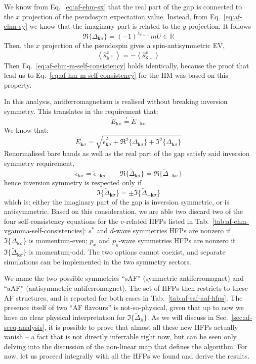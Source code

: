 \begin{tabproof}
	
	We know from Eq.~\eqref{eq:af-ehm-sx} that the real part of the gap is connected to the $x$ projection of the pseudospin expectation value. Instead, from Eq.~\eqref{eq:af-ehm-sy} we know that the imaginary part is related to the $y$ projection. It follows
	\[
		\Re \lbrace \tilde{\Delta}_{\mathbf{k}\sigma} \rbrace = (-1)^{\delta_{\sigma=\downarrow}} mU \in \mathbb{R}
	\]
	Then, the $x$ projection of the pseudospin gives a spin-antisymmetric EV,	
	\[
	\left\langle \hat s_{\mathbf{k}\uparrow}^x \right\rangle = -\left\langle \hat s_{\mathbf{k}\downarrow}^x \right\rangle
	\]
	Then Eq.~\eqref{eq:af-ehm-m-self-consistency} holds identically, because the proof that lead us to Eq.~\eqref{eq:af-hm-m-self-consistency} for the HM was based on this property.
	
\end{tabproof}

In this analysis, antiferromagnetism is realised without breaking inversion symmetry. This translates in the requirement that:
\[
\tilde{E}_{\mathbf{k}\sigma} \stackrel{!}{=} \tilde{E}_{-\mathbf{k}\sigma}
\]
We know that:
\[
\tilde{E}_{\mathbf{k}\sigma} = \sqrt{
	\tilde{\epsilon}_{\mathbf{k}\sigma}^2 + \Re^2\lbrace \tilde{\Delta}_{\mathbf{k}\sigma}\rbrace+ \Im^2\lbrace \tilde{\Delta}_{\mathbf{k}\sigma}\rbrace
}
\]
Renormalised bare bands as well as the real part of the gap satisfy said inversion symmetry requirement,
\[
\tilde{\epsilon}_{\mathbf{k}\sigma} = \tilde{\epsilon}_{-\mathbf{k}\sigma}
\qquad
\Re\lbrace \tilde{\Delta}_{\mathbf{k}\sigma}\rbrace = \Re\lbrace \tilde{\Delta}_{-\mathbf{k}\sigma}\rbrace
\]
hence inversion symmetry is respected only if
\[
\Im\lbrace \tilde{\Delta}_{\mathbf{k}\sigma}\rbrace = \pm\Im\lbrace \tilde{\Delta}_{-\mathbf{k}\sigma}\rbrace
\]
which is: either the imaginary part of the gap is inversion symmetric, or is antisymmetric. Based on this consideration, we are able two discard two of the four self-consistency equations for the $v$-related HFPs listed in Tab.~\ref{tab:af-ehm-vgamma-self-consistencies}: $s^*$ and $d$-wave symmetries HFPs are nonzero if $\Im\lbrace \tilde{\Delta}_{\mathbf{k}\sigma}\rbrace$ is momentum-even; $p_x$ and $p_y$-wave symmetries HFPs are nonzero if $\Im\lbrace \tilde{\Delta}_{\mathbf{k}\sigma}\rbrace$ is momentum-odd. The two options cannot coexist, and separate simulations can be implemented in the two symmetry sectors.

We name the two possible symmetries ``sAF'' (symmetric antiferromagnet) and ``aAF'' (antisymmetric antiferromagnet). The set of HFPs then restricts to these AF structures, and is reported for both cases in Tab.~\ref{tab:af-saf-aaf-hfps}. The presence itself of two ``AF flavours'' is not-so-physical, given that up to now we have no clear physical interpretation for $\Im\lbrace\tilde{\Delta}_\mathbf{k}\rbrace$. As we will discuss in Sec.~\ref{sec:af-sceq-analysis}, it is possible to prove that almost all these new HFPs actually vanish -- a fact that is not directly inferrable right now, but can be seen only delving into the discussion of the non-linear map that defines the algorithm. For now, let us proceed integrally with all the HFPs we found and derive the results.

